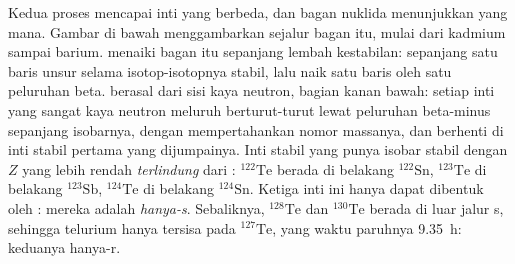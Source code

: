 Kedua proses mencapai inti yang berbeda, dan bagan nuklida
menunjukkan yang mana. Gambar di bawah menggambarkan sejalur bagan itu, mulai dari kadmium
sampai barium.  menaiki bagan itu sepanjang lembah kestabilan: sepanjang satu
baris unsur selama isotop-isotopnya stabil, lalu naik satu baris oleh satu
peluruhan beta.  berasal dari sisi kaya neutron, bagian kanan bawah:
setiap inti yang sangat kaya neutron meluruh berturut-turut lewat
peluruhan beta-minus sepanjang isobarnya, dengan mempertahankan nomor massanya, dan berhenti di
inti stabil pertama yang dijumpainya. Inti stabil yang punya isobar stabil dengan
$Z$ yang lebih rendah \emph{terlindung} dari : $^{122}\mathrm{Te}$
berada di belakang $^{122}\mathrm{Sn}$, $^{123}\mathrm{Te}$ di belakang
$^{123}\mathrm{Sb}$, $^{124}\mathrm{Te}$ di belakang $^{124}\mathrm{Sn}$.
Ketiga inti ini hanya dapat dibentuk oleh : mereka adalah
\emph{hanya-s}. Sebaliknya, $^{128}\mathrm{Te}$ dan $^{130}\mathrm{Te}$
berada di luar jalur s, sehingga telurium hanya tersisa pada $^{127}\mathrm{Te}$,
yang waktu paruhnya \qty{9.35}{h}: keduanya hanya-r.

